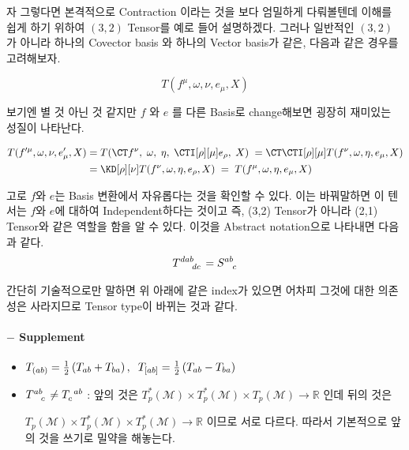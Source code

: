 \documentclass[paper=a4, fontsize=11pt]{scrartcl} %
\numberwithin{equation}{section} %
\numberwithin{figure}{section} %
\numberwithin{table}{section} %
\theoremstyle{plain}
\newcommand{\Com}{,\Hs}
\newcommand{\Hs}{\hspace{0.1cm}}
\newcommand{\HS}{\hspace{0.5cm}}
\newcommand{\VS}{\vspace{0.3cm}}
\newcommand{\BKS}[1]{\left( #1 \right)}
\newcommand{\Tangent}{T_p (\Manifold)}
\newcommand{\Cotangent}{T^{*}_p (\Manifold)}
\newcommand{\Manifold}{\mathcal{M}}
\begin{document}
\pagebreak

\HS 자 그렇다면 본격적으로 Contraction 이라는 것을 보다 엄밀하게 다뤄볼텐데 이해를 쉽게 하기 위하여 $(3,2)$ Tensor를 예로 들어 설명하겠다. 그러나 일반적인 $(3,2)$ 가 아니라 하나의 Covector basis 와 하나의 Vector basis가 같은, 다음과 같은 경우를 고려해보자.

\begin{equation*}
 T(f^{\mu},\omega,\nu,e_{\mu},X)
\end{equation*}

보기엔 별 것 아닌 것 같지만 $f$ 와 $e$ 를 다른 Basis로 change해보면 굉장히 재미있는 성질이 나타난다.

\begin{align}
\begin{split}
 T(f'^{\mu},\omega,\nu,e'_{\mu},X) &= T(\CT f^{\nu}\Com \omega\Com \eta\Com \CTI[\rho][\mu]e_\rho\Com X)\Hs = \CT \CTI[\rho][\mu] T(f^\nu, \omega, \eta, e_\mu, X) \\
 & = \KD[\rho][\nu] T(f^\nu, \omega,\eta,e_\rho,X)\Hs = \Hs T(f^\mu,\omega,\eta,e_\mu,X)
\end{split}
\end{align}

\VS

고로 $f$와 $e$는 Basis 변환에서 자유롭다는 것을 확인할 수 있다. 이는 바꿔말하면 이 텐서는 $f$와 $e$에 대하여 Independent하다는 것이고 즉, (3,2) Tensor가 아니라
(2,1) Tensor와 같은 역할을 함을 알 수 있다. 이것을 Abstract notation\footnotemark 으로 나타내면 다음과 같다.
\begin{equation}
 \tensor{T}{^d ^a ^b _d _c} = \tensor{S}{^a ^b _c }
\end{equation}

간단히 기술적으로만 말하면 위 아래에 같은 index가 있으면 어차피 그것에 대한 의존성은 사라지므로 Tensor type이 바뀌는 것과 같다.

\paragraph{$-$ Supplement}

\begin{itemize}
 \item $T_{(ab)} = \frac{1}{2} \BKS{T_{ab} + T_{ba}}\Com\Hs T_{[ab]} = \frac{1}{2}\BKS{T_{ab} - T_{ba}  }$
 \item $\tensor{T}{^a^b_c} \neq \tensor{T}{_c ^a ^b}$ : 앞의 것은 $\Cotangent\times\Cotangent\times\Tangent \rightarrow \mathbb{R}$ 인데 뒤의 것은 
 
 $\Tangent\times\Cotangent\times\Cotangent\rightarrow\mathbb{R}$ 이므로 서로 다르다. 따라서 기본적으로 앞의 것을 쓰기로 밀약을 해놓는다.
\end{itemize}
\end{document}

